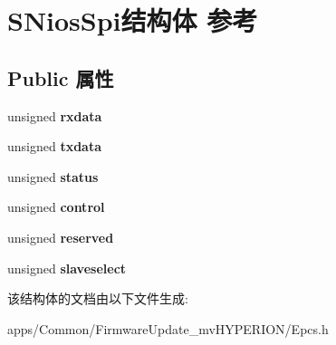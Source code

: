 \hypertarget{struct_s_nios_spi}{\section{S\+Nios\+Spi结构体 参考}
\label{struct_s_nios_spi}
}
\subsection*{Public 属性}
\begin{DoxyCompactItemize}
\item 
\hypertarget{struct_s_nios_spi_a2ec6d167475a28d1b8aa0bef1ae3f37a}{unsigned {\bfseries rxdata}}\label{struct_s_nios_spi_a2ec6d167475a28d1b8aa0bef1ae3f37a}

\item 
\hypertarget{struct_s_nios_spi_a546d30ff2e03c871707306831682204c}{unsigned {\bfseries txdata}}\label{struct_s_nios_spi_a546d30ff2e03c871707306831682204c}

\item 
\hypertarget{struct_s_nios_spi_aec19fffc88cf329e9fba408ed3f3cb9c}{unsigned {\bfseries status}}\label{struct_s_nios_spi_aec19fffc88cf329e9fba408ed3f3cb9c}

\item 
\hypertarget{struct_s_nios_spi_ad1dabf816f86d3cff178b1ec3aba49a7}{unsigned {\bfseries control}}\label{struct_s_nios_spi_ad1dabf816f86d3cff178b1ec3aba49a7}

\item 
\hypertarget{struct_s_nios_spi_a016ba61dc069b889e4a0ab66ee33af8b}{unsigned {\bfseries reserved}}\label{struct_s_nios_spi_a016ba61dc069b889e4a0ab66ee33af8b}

\item 
\hypertarget{struct_s_nios_spi_a2169fd68569c549c47bcb3a3a43d8f43}{unsigned {\bfseries slaveselect}}\label{struct_s_nios_spi_a2169fd68569c549c47bcb3a3a43d8f43}

\end{DoxyCompactItemize}


该结构体的文档由以下文件生成\+:\begin{DoxyCompactItemize}
\item 
apps/\+Common/\+Firmware\+Update\+\_\+mv\+H\+Y\+P\+E\+R\+I\+O\+N/Epcs.\+h\end{DoxyCompactItemize}
